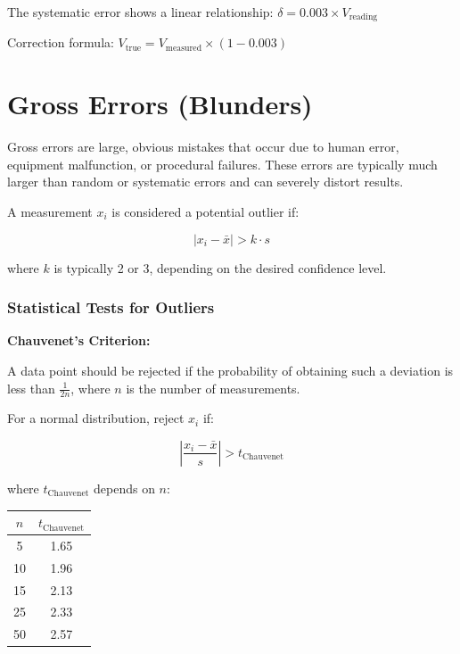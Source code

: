 \documentclass[twoside]{book}
\begin{document}
The systematic error shows a linear relationship: $\delta = 0.003 \times V_{\text{reading}}$

Correction formula: $V_{\text{true}} = V_{\text{measured}} \times (1 - 0.003)$

\section{Gross Errors (Blunders)}

Gross errors are large, obvious mistakes that occur due to human error, equipment malfunction, or procedural failures. These errors are typically much larger than random or systematic errors and can severely distort results.

A measurement $x_i$ is considered a potential outlier if:

\begin{equation*}
|x_i - \bar{x}| > k \cdot s
\end{equation*}

where $k$ is typically 2 or 3, depending on the desired confidence level.

\subsubsection{Statistical Tests for Outliers}

\textbf{Chauvenet's Criterion:}

A data point should be rejected if the probability of obtaining such a deviation is less than $\frac{1}{2n}$, where $n$ is the number of measurements.

For a normal distribution, reject $x_i$ if:

\begin{equation*}
\left|\frac{x_i - \bar{x}}{s}\right| > t_{\text{Chauvenet}}
\end{equation*}

where $t_{\text{Chauvenet}}$ depends on $n$:

\begin{center}
\begin{tabular}{cc}
\toprule
$n$ & $t_{\text{Chauvenet}}$ \\
\midrule
5 & 1.65 \\
10 & 1.96 \\
15 & 2.13 \\
25 & 2.33 \\
50 & 2.57 \\
\bottomrule
\end{tabular}
\end{center}
\end{document}
